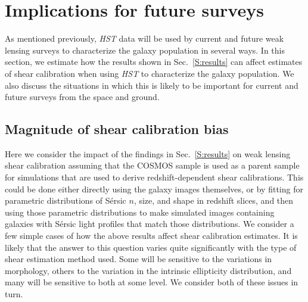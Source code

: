 \documentclass[twocolumn,useAMS,usenatbib]{mn2e}
\newcommand{\sersic}{S\'{e}rsic }
\begin{document}
\section{Implications for future surveys}\label{S:implications}

As mentioned previously, {\em HST} data will be used by
current and future weak
lensing surveys to characterize the galaxy population in several
ways.  In this section, we estimate how the results shown in
Sec.~\ref{S:results} can affect estimates of shear calibration when
using {\em HST} to characterize the galaxy population.  We also
discuss the situations in which this is likely to be important for
current and future surveys from the space and ground.

\subsection{Magnitude of shear calibration bias}

Here we consider the impact of the findings in
  Sec.~\ref{S:results} on weak lensing shear calibration assuming that
  the COSMOS sample is used as a parent sample for simulations that
  are used to derive redshift-dependent shear calibrations.  This
  could be done either directly using the galaxy images themselves, or
  by fitting for parametric distributions of \sersic $n$, size, and
  shape in redshift slices, and then using those parametric
  distributions to make simulated images containing galaxies with
  \sersic light profiles that match those distributions.  We consider a few simple cases of how the
  above results affect shear calibration estimates.  It is likely that
  the answer to this question varies quite significantly with the type
  of shear estimation method used.  Some will be sensitive to the
  variations in morphology, others to the variation in the intrinsic
  ellipticity distribution, and many will be sensitive to both at some
  level.  We consider both of these issues in turn.
\end{document}
